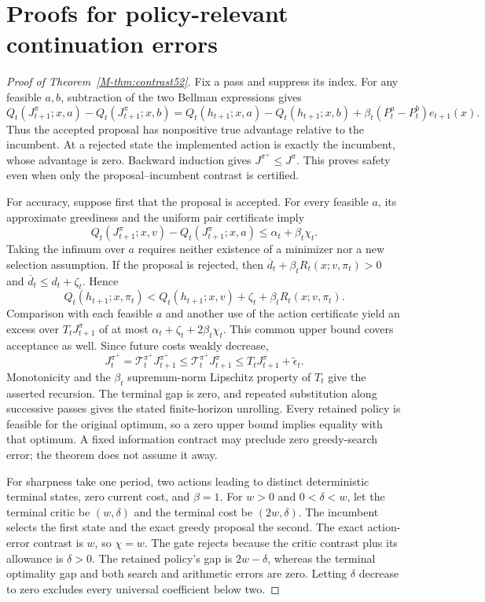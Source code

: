 \section{Proofs for policy-relevant continuation errors}\label{supp:contrast52}
\begin{proof}[Proof of Theorem~\ref{M-thm:contrast52}]
Fix a pass and suppress its index. For any feasible $a,b$, subtraction of the two Bellman expressions gives
\[
 Q_t(J_{t+1}^\pi;x,a)-Q_t(J_{t+1}^\pi;x,b)
 =Q_t(h_{t+1};x,a)-Q_t(h_{t+1};x,b)
       +\beta_t(P_t^a-P_t^b)e_{t+1}(x).
\]
Thus the accepted proposal has nonpositive true advantage relative to the incumbent. At a rejected state the implemented action is exactly the incumbent, whose advantage is zero. Backward induction gives $J^{\pi^+}\le J^\pi$. This proves safety even when only the proposal--incumbent contrast is certified.

For accuracy, suppose first that the proposal is accepted. For every feasible $a$, its approximate greediness and the uniform pair certificate imply
\[
 Q_t(J_{t+1}^\pi;x,v)-Q_t(J_{t+1}^\pi;x,a)
 \le\alpha_t+\beta_t\chi_t.
\]
Taking the infimum over $a$ requires neither existence of a minimizer nor a new selection assumption. If the proposal is rejected, then
$\overline d_t+\beta_tR_t(x;v,\pi_t)>0$ and
$\overline d_t\le d_t+\zeta_t$. Hence
\[
 Q_t(h_{t+1};x,\pi_t)
 <Q_t(h_{t+1};x,v)+\zeta_t+\beta_tR_t(x;v,\pi_t).
\]
Comparison with each feasible $a$ and another use of the action certificate yield an excess over $T_tJ_{t+1}^\pi$ of at most
$\alpha_t+\zeta_t+2\beta_t\chi_t$.
This common upper bound covers acceptance as well. Since future costs weakly decrease,
\[
 J_t^{\pi^+}=\mathcal T_t^{\pi^+}J_{t+1}^{\pi^+}
 \le\mathcal T_t^{\pi^+}J_{t+1}^{\pi}
 \le T_tJ_{t+1}^{\pi}+\tilde\epsilon_t.
\]
Monotonicity and the $\beta_t$ supremum-norm Lipschitz property of $T_t$ give the asserted recursion. The terminal gap is zero, and repeated substitution along successive passes gives the stated finite-horizon unrolling. Every retained policy is feasible for the original optimum, so a zero upper bound implies equality with that optimum. A fixed information contract may preclude zero greedy-search error; the theorem does not assume it away.

For sharpness take one period, two actions leading to distinct deterministic terminal states, zero current cost, and $\beta=1$. For $w>0$ and $0<\delta<w$, let the terminal critic be $(w,\delta)$ and the terminal cost be $(2w,\delta)$. The incumbent selects the first state and the exact greedy proposal the second. The exact action-error contrast is $w$, so $\chi=w$. The gate rejects because the critic contrast plus its allowance is $\delta>0$. The retained policy's gap is $2w-\delta$, whereas the terminal optimality gap and both search and arithmetic errors are zero. Letting $\delta$ decrease to zero excludes every universal coefficient below two.
\end{proof}

